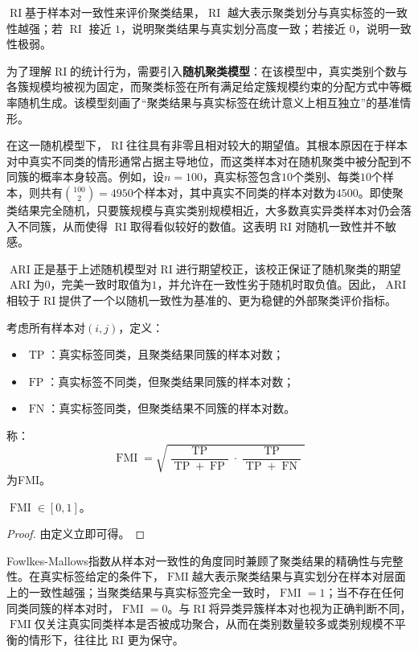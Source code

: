 \begin{note}
	$\operatorname{RI}$基于样本对一致性来评价聚类结果，$\operatorname{RI}$ 越大表示聚类划分与真实标签的一致性越强；若 $\operatorname{RI}$ 接近 $1$，说明聚类结果与真实划分高度一致；若接近 $0$，说明一致性极弱。\par
	为了理解$\operatorname{RI}$的统计行为，需要引入\textbf{随机聚类模型}：在该模型中，真实类别个数与各簇规模均被视为固定，而聚类标签在所有满足给定簇规模约束的分配方式中等概率随机生成。该模型刻画了“聚类结果与真实标签在统计意义上相互独立”的基准情形。\par
	在这一随机模型下，$\operatorname{RI}$往往具有非零且相对较大的期望值。其根本原因在于样本对中真实不同类的情形通常占据主导地位，而这类样本对在随机聚类中被分配到不同簇的概率本身较高。例如，设$n=100$，真实标签包含$10$个类别、每类$10$个样本，则共有$\binom{100}{2}=4950$个样本对，其中真实不同类的样本对数为$4500$。即使聚类结果完全随机，只要簇规模与真实类别规模相近，大多数真实异类样本对仍会落入不同簇，从而使得 $\operatorname{RI}$取得看似较好的数值。这表明$\operatorname{RI}$对随机一致性并不敏感。\par
	$\operatorname{ARI}$正是基于上述随机模型对$\operatorname{RI}$进行期望校正，该校正保证了随机聚类的期望$\operatorname{ARI}$为$0$，完美一致时取值为$1$，并允许在一致性劣于随机时取负值。因此，$\operatorname{ARI}$相较于$\operatorname{RI}$提供了一个以随机一致性为基准的、更为稳健的外部聚类评价指标。
\end{note}
\begin{definition}
	考虑所有样本对$(i,j)$，定义：
	\begin{itemize}
		\item $\operatorname{TP}$：真实标签同类，且聚类结果同簇的样本对数；
		\item $\operatorname{FP}$：真实标签不同类，但聚类结果同簇的样本对数；
		\item $\operatorname{FN}$：真实标签同类，但聚类结果不同簇的样本对数。
	\end{itemize}
	称：
	\begin{equation*}
		\operatorname{FMI}=\sqrt{\frac{\operatorname{TP}}{\operatorname{TP}+\operatorname{FP}}\cdot\frac{\operatorname{TP}}{\operatorname{TP}+\operatorname{FN}}}
	\end{equation*}
	为\gls{FMI}。
\end{definition}
\begin{property}\label{prop:FMI}
	$\operatorname{FMI}\in[0,1]$。
\end{property}
\begin{proof}
	由定义立即可得。
\end{proof}
\begin{note}
	Fowlkes-Mallows指数从样本对一致性的角度同时兼顾了聚类结果的精确性与完整性。在真实标签给定的条件下，$\operatorname{FMI}$越大表示聚类结果与真实划分在样本对层面上的一致性越强；当聚类结果与真实标签完全一致时，$\operatorname{FMI}=1$；当不存在任何同类同簇的样本对时，$\operatorname{FMI}=0$。与$\operatorname{RI}$将异类异簇样本对也视为正确判断不同，$\operatorname{FMI}$仅关注真实同类样本是否被成功聚合，从而在类别数量较多或类别规模不平衡的情形下，往往比 RI 更为保守。
\end{note}

